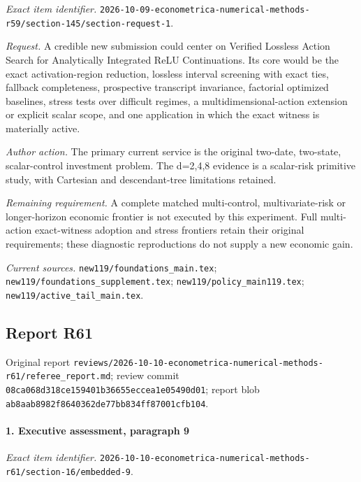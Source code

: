 \emph{Exact item identifier.} \nolinkurl{2026-10-09-econometrica-numerical-methods-r59/section-145/section-request-1}.

\par\emph{Request.} A credible new submission could center on Verified Lossless Action Search for Analytically Integrated ReLU Continuations. Its core would be the exact activation-region reduction, lossless interval screening with exact ties, fallback completeness, prospective transcript invariance, factorial optimized baselines, stress tests over difficult regimes, a multidimensional-action extension or explicit scalar scope, and one application in which the exact witness is materially active.

\par\emph{Author action.} The primary current service is the original two-date, two-state, scalar-control investment problem. The d=2,4,8 evidence is a scalar-risk primitive study, with Cartesian and descendant-tree limitations retained.

\par\emph{Remaining requirement.} A complete matched multi-control, multivariate-risk or longer-horizon economic frontier is not executed by this experiment. Full multi-action exact-witness adoption and stress frontiers retain their original requirements; these diagnostic reproductions do not supply a new economic gain.

\par\emph{Current sources.} \nolinkurl{new119/foundations_main.tex}; \nolinkurl{new119/foundations_supplement.tex}; \nolinkurl{new119/policy_main119.tex}; \nolinkurl{new119/active_tail_main.tex}.

\subsection{Report R61}

Original report \nolinkurl{reviews/2026-10-10-econometrica-numerical-methods-r61/referee_report.md}; review commit \nolinkurl{08ca068d318ce159401b36655eccea1e05490d01}; report blob \nolinkurl{ab8aab8982f8640362de77bb834ff87001cfb104}.

\paragraph{1. Executive assessment, paragraph 9}

\emph{Exact item identifier.} \nolinkurl{2026-10-10-econometrica-numerical-methods-r61/section-16/embedded-9}.

